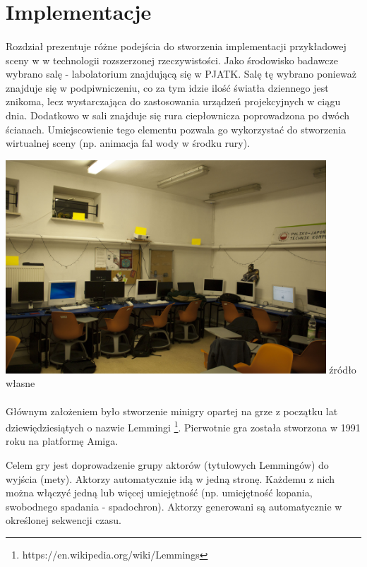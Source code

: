 \newpage
\section{Implementacje}
\paragraph{}
Rozdział prezentuje różne podejścia do stworzenia implementacji przykładowej sceny w w technologii rozszerzonej rzeczywistości.
Jako środowisko badawcze wybrano salę - labolatorium znajdującą się w PJATK. Salę tę wybrano ponieważ znajduje się w podpiwniczeniu, co za tym idzie ilość światła dziennego jest znikoma, lecz wystarczająca do zastosowania urządzeń projekcyjnych w ciągu dnia. Dodatkowo w sali znajduje się rura ciepłownicza poprowadzona po dwóch ścianach. Umiejscowienie tego elementu pozwala go wykorzystać do stworzenia wirtualnej sceny (np. animacja fal wody w środku rury).

\begin{center}
\includegraphics[width=0.9\textwidth]{images/s9.jpg}
\small {źródło własne }
\end{center}

\paragraph{}
Głównym założeniem było stworzenie minigry opartej na grze z początku lat dziewiędziesiątych o nazwie Lemmingi \footnote{https://en.wikipedia.org/wiki/Lemmings}. Pierwotnie gra została stworzona w 1991 roku na platformę Amiga.

Celem gry jest doprowadzenie grupy aktorów (tytułowych Lemmingów) do wyjścia (mety). Aktorzy automatycznie idą w jedną stronę. Każdemu z nich można włączyć jedną lub więcej umiejętność (np. umiejętność kopania, swobodnego spadania - spadochron). Aktorzy generowani są automatycznie w określonej sekwencji czasu.

